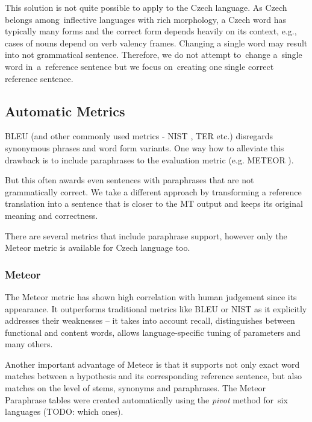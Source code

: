 \documentclass[11pt]{article}
\begin{document}
This solution is not quite possible to apply to the Czech language. As Czech belongs 
among~inflective languages with rich morphology, a Czech word has typically many forms 
and the correct form depends heavily on its context, e.g., cases of nouns depend on verb 
valency frames. Changing a single word may result into not grammatical sentence. Therefore, 
we do not attempt to~change a~single word in~a~reference sentence but we focus on~creating 
one single correct reference sentence.


\subsection{Automatic Metrics}
BLEU (and other commonly used metrics - NIST \cite{nist}, TER \cite{ter} etc.) 
disregards synonymous phrases and word form variants. One way how to  alleviate this 
drawback is to include paraphrases to the evaluation metric (e.g. METEOR \cite{meteor}). 

But this often awards even sentences with paraphrases that are not grammatically correct. 
We take a different approach by transforming a reference translation into a sentence that 
is closer to the MT output and keeps its original meaning and correctness.

There are several metrics that include paraphrase support, however only the Meteor metric
is available for Czech language too.%

\subsubsection{Meteor}
The Meteor metric \cite{meteor-wmt:2011} has shown high correlation with human 
judgement since its appearance. It outperforms traditional metrics like BLEU \cite{bleu} 
or NIST \cite{nist} as it explicitly addresses their weaknesses -- it takes into account 
recall, distinguishes between functional and content words, allows language-specific 
tuning of parameters and many others.

Another important advantage of Meteor is that it supports not only exact word matches 
between a hypothesis and its corresponding reference sentence, but also matches on the 
level of stems, synonyms and paraphrases. The Meteor Paraphrase tables \cite{meteor-tables} 
were created automatically using the \textit{pivot} method \cite{pivoting} for~six languages 
(TODO: which ones).
\end{document}
